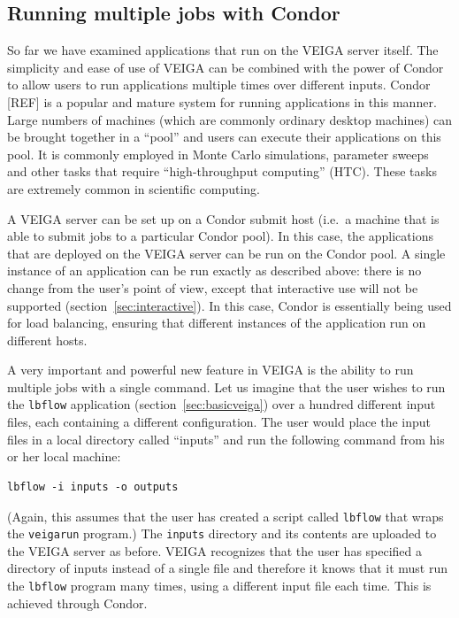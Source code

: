 \documentclass[a4paper]{article}
\begin{document}
\begin{multicols}{2}
\section{Running multiple jobs with Condor}\label{sec:condor}
So far we have examined applications that run on the VEIGA server itself.  The simplicity and ease of use of VEIGA can be combined with the power of Condor to allow users to run applications multiple times over different inputs.  Condor [REF] is a popular and mature system for running applications in this manner.  Large numbers of machines (which are commonly ordinary desktop machines) can be brought together in a ``pool'' and users can execute their applications on this pool.  It is commonly employed in Monte Carlo simulations, parameter sweeps and other tasks that require ``high-throughput computing'' (HTC).  These tasks are extremely common in scientific computing.

A VEIGA server can be set up on a Condor submit host (i.e.\ a machine that is able to submit jobs to a particular Condor pool).  In this case, the applications that are deployed on the VEIGA server can be run on the Condor pool.  A single instance of an application can be run exactly as described above: there is no change from the user's point of view, except that interactive use will not be supported (section~\ref{sec:interactive}).  In this case, Condor is essentially being used for load balancing, ensuring that different instances of the application run on different hosts.

A very important and powerful new feature in VEIGA is the ability to run multiple jobs with a single command.  Let us imagine that the user wishes to run the  {\tt lbflow} application (section~\ref{sec:basicveiga}) over a hundred different input files, each containing a different configuration.  The user would place the input files in a local directory called ``inputs'' and run the following command from his or her local machine:

\begin{verbatim}
lbflow -i inputs -o outputs
\end{verbatim}
(Again, this assumes that the user has created a script called {\tt lbflow} that wraps the {\tt veigarun} program.)  The {\tt inputs} directory and its contents are uploaded to the VEIGA server as before.  VEIGA recognizes that the user has specified a directory of inputs instead of a single file and therefore it knows that it must run the {\tt lbflow} program many times, using a different input file each time.  This is achieved through Condor.


\end{multicols}
\end{document}
